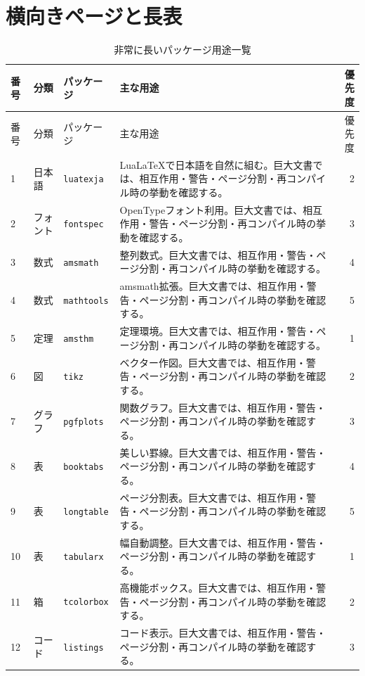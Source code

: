 \documentclass[12pt,a4paper,openany]{ltjsbook}
\theoremstyle{definition}
\theoremstyle{plain}
\theoremstyle{remark}
\begin{document}
\chapter{横向きページと長表}
\begin{landscape}
\begin{longtable}{llp{55mm}p{80mm}r}
\caption{非常に長いパッケージ用途一覧}\label{tab:long-package-list}\\
\toprule
番号 & 分類 & パッケージ & 主な用途 & 優先度\\
\midrule
\endfirsthead
\toprule
番号 & 分類 & パッケージ & 主な用途 & 優先度\\
\midrule
\endhead
1 & 日本語 & \texttt{luatexja} & LuaLaTeXで日本語を自然に組む。巨大文書では、相互作用・警告・ページ分割・再コンパイル時の挙動を確認する。 & 2\\
2 & フォント & \texttt{fontspec} & OpenTypeフォント利用。巨大文書では、相互作用・警告・ページ分割・再コンパイル時の挙動を確認する。 & 3\\
3 & 数式 & \texttt{amsmath} & 整列数式。巨大文書では、相互作用・警告・ページ分割・再コンパイル時の挙動を確認する。 & 4\\
4 & 数式 & \texttt{mathtools} & amsmath拡張。巨大文書では、相互作用・警告・ページ分割・再コンパイル時の挙動を確認する。 & 5\\
5 & 定理 & \texttt{amsthm} & 定理環境。巨大文書では、相互作用・警告・ページ分割・再コンパイル時の挙動を確認する。 & 1\\
6 & 図 & \texttt{tikz} & ベクター作図。巨大文書では、相互作用・警告・ページ分割・再コンパイル時の挙動を確認する。 & 2\\
7 & グラフ & \texttt{pgfplots} & 関数グラフ。巨大文書では、相互作用・警告・ページ分割・再コンパイル時の挙動を確認する。 & 3\\
8 & 表 & \texttt{booktabs} & 美しい罫線。巨大文書では、相互作用・警告・ページ分割・再コンパイル時の挙動を確認する。 & 4\\
9 & 表 & \texttt{longtable} & ページ分割表。巨大文書では、相互作用・警告・ページ分割・再コンパイル時の挙動を確認する。 & 5\\
10 & 表 & \texttt{tabularx} & 幅自動調整。巨大文書では、相互作用・警告・ページ分割・再コンパイル時の挙動を確認する。 & 1\\
11 & 箱 & \texttt{tcolorbox} & 高機能ボックス。巨大文書では、相互作用・警告・ページ分割・再コンパイル時の挙動を確認する。 & 2\\
12 & コード & \texttt{listings} & コード表示。巨大文書では、相互作用・警告・ページ分割・再コンパイル時の挙動を確認する。 & 3\\

\end{longtable}
\end{landscape}
\end{document}
